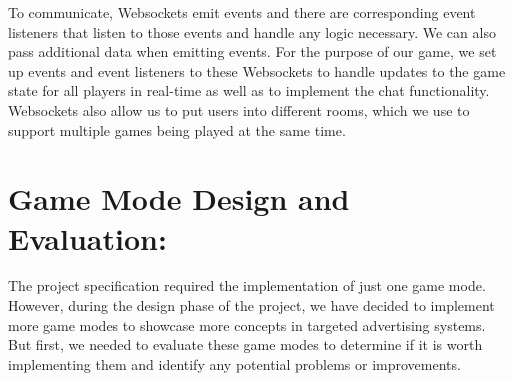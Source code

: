 \documentclass{l4proj}
\begin{document}
\begin{itemize}
\begin{figure}
    \label{fig:sysarch} 
\end{figure}


To communicate, Websockets emit events and there are corresponding event listeners that listen to those events and handle any logic necessary. We can also pass additional data when emitting events. For the purpose of our game, we set up events and event listeners to these Websockets to handle updates to the game state for all players in real-time as well as to implement the chat functionality. Websockets also allow us to put users into different rooms, which we use to support multiple games being played at the same time.
\end{itemize}

\section{Game Mode Design and Evaluation:}
The project specification required the implementation of just one game mode. However, during the design phase of the project, we have decided to implement more game modes to showcase more concepts in targeted advertising systems. But first, we needed to evaluate these game modes to determine if it is worth implementing them and identify any potential problems or improvements.
\end{document}
